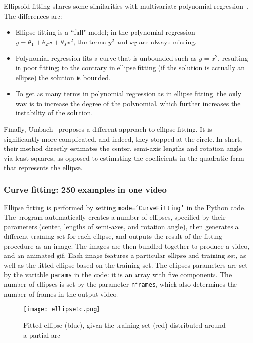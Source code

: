 \documentclass[oneside,10pt]{book}
\begin{document}
\noindent Ellipsoid fitting shares some similarities with multivariate polynomial regression~\cite{vaccari2007}.  The differences are: 
\begin{itemize}
\item Ellipse fitting is a ``full" model;  in the polynomial regression $y=\theta_1+\theta_2 x + \theta_3 x^2$, the terms $y^2$ and $xy$ are always missing.
\item Polynomial regression fits a curve that is unbounded such as $y=x^2$, resulting in poor fitting; to the contrary in ellipse fitting (if the solution is actually an ellipse) the solution is bounded.
 \item To get as many terms in polynomial regression as in ellipse fitting, the only way is to increase the degree of the polynomial, which further increases the instability of the solution.
\end{itemize}  

\noindent Finally, Umbach~\cite{ieee200y} proposes a different approach to ellipse fitting. It is significantly more complicated, and indeed, they stopped at the circle. In short, their method directly estimates the center, semi-axis lengths and rotation angle via least squares, as opposed to estimating the coefficients in the quadratic form that represents the ellipse. 

\subsubsection{Curve fitting: 250 examples in one video}

Ellipse fitting is performed by setting \texttt{mode='CurveFitting'} in the Python code. The program automatically creates a number of ellipses, specified by their parameters (center, lengths of semi-axes, and rotation angle), then generates a different training set for each ellipse, and outputs the result of the fitting procedure as an image. The images are then bundled together to produce a video, and an animated gif. Each image features a particular 
 ellipse and training set, as well as the fitted ellipse based on the training set. The ellipses parameters are set by the variable \texttt{params} in the code: it is an array with five components. The number of ellipses is set by the parameter \texttt{nframes}, which also determines the number of frames in the output video.

\begin{figure}%
\centering
\texttt{[image: ellipse1c.png]}  
\caption{Fitted ellipse (blue), given the training set (red) distributed around a partial arc}
\label{fig:ellipse11b}
\end{figure}
\end{document}
